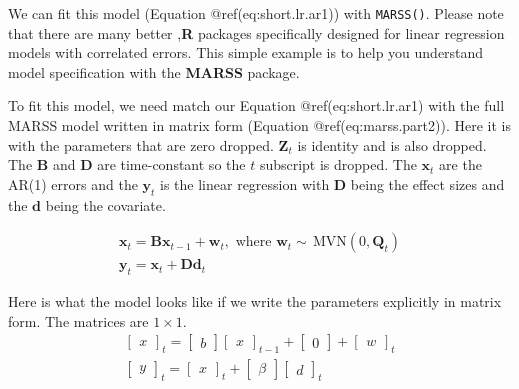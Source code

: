 \documentclass[12pt,]{book}
\begin{document}
We can fit this model (Equation @ref(eq:short.lr.ar1)) with \texttt{MARSS()}. Please note that there are many better ,\textbf{R} packages specifically designed for linear regression models with correlated errors. This simple example is to help you understand model specification with the \textbf{MARSS} package.

To fit this model, we need match our Equation @ref(eq:short.lr.ar1) with the full MARSS model written in matrix form (Equation @ref(eq:marss.part2)). Here it is with the parameters that are zero dropped. \(\mathbf{Z}_t\) is identity and is also dropped. The \(\mathbf{B}\) and \(\mathbf{D}\) are time-constant so the \(t\) subscript is dropped. The \(\mathbf{x}_t\) are the AR(1) errors and the \(\mathbf{y}_t\) is the linear regression with \(\mathbf{D}\) being the effect sizes and the \(\mathbf{d}\) being the covariate.

\begin{equation}\label{eq:short-lr-ar1-marss}
\begin{gathered}
\mathbf{x}_t = \mathbf{B}\mathbf{x}_{t-1} + \mathbf{w}_t, \text{ where } \mathbf{w}_t \sim \,\text{MVN}(0,\mathbf{Q}_t)\\
\mathbf{y}_t = \mathbf{x}_t + \mathbf{D}\mathbf{d}_t
\end{gathered}
\end{equation}

Here is what the model looks like if we write the parameters explicitly in matrix form. The matrices are \(1 \times 1\).
\begin{equation}
\begin{gathered}
\begin{bmatrix}x\end{bmatrix}_{t} = \begin{bmatrix}b\end{bmatrix}\begin{bmatrix}x\end{bmatrix}_{t-1} + \begin{bmatrix}0\end{bmatrix} + \begin{bmatrix}w\end{bmatrix}_{t}  \\
\begin{bmatrix}y\end{bmatrix}_{t} = \begin{bmatrix}x\end{bmatrix}_{t} + \begin{bmatrix}\beta\end{bmatrix}\begin{bmatrix}d\end{bmatrix}_t
\end{gathered}
\label{eq:short-lr-ar1-mat}
\end{equation}
\end{document}
